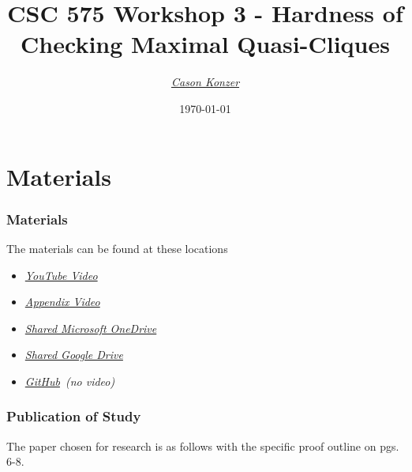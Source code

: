 \documentclass{beamer}
\title[Workshop 1]{CSC 575 Workshop 3 - Hardness of Checking Maximal Quasi-Cliques}
\author{\XV\textit{\large{\href{https://github.com/casonk}{Cason Konzer}}}\XB}
\institute[UM FLINT]{\normalsize{\textit{\href{mailto:casonk@umich.edu}{casonk@umich.edu}}}}
\date[]{\today}
\newcommand{\XB}{\color{black}}
\newcommand{\XV}{\color{violet}}
\begin{document}
\begin{frame}
    \titlepage
\end{frame}




\section{Materials}

\begin{frame}

    \frametitle{Materials}

    The materials can be found at these locations

    \vspace{2.5mm}
    \begin{itemize}
        \item \XV\textit{\large{\href{https://youtu.be/GZLSmGtB7Gg}{YouTube Video}}}\XB
        \item \XV\textit{\large{\href{https://youtu.be/AZWqPGodaTk}{Appendix Video}}}\XB
        \item \XV\textit{\large{\href{https://umich-my.sharepoint.com/:f:/g/personal/casonk_umich_edu/EowkLIGd-RVGsobVXZtum0MBk25G4taRHPlRAHKnd5MKUQ?e=8J49hs}{Shared Microsoft OneDrive}}}\XB
        \item \XV\textit{\large{\href{https://drive.google.com/drive/folders/1DDmc5UmoVXOOu7jOyl1UgvuIHD99sH2t?usp=sharing}{Shared Google Drive}}}\XB
        \item \XV\textit{\large{\href{https://github.com/casonk/CSC575-Algorithm_and_Complexity_Analysis/tree/main/WorkShop/Workshop3}{GitHub}}}\XB \ \emph{(no video)}
    \end{itemize}

\end{frame}

\begin{frame}

  \frametitle{Publication of Study}

  The paper chosen for research is as follows with the specific proof outline on pgs. 6-8.
  \vspace{2.5mm}

  \cite{Mehri}
  {}
  
\end{frame}
\end{document}
